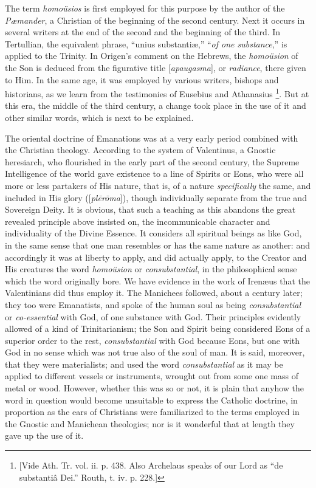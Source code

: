The term \emph{homoüsios} is first employed for this purpose by
the author of the \emph{Pæmander}, a Christian of the beginning of
the second century. Next it occurs in several writers at the end of
the second and the beginning of the third. In Tertullian, the
equivalent phrase, ``unius substantiæ,'' ``\emph{of one
substance},'' is applied to the Trinity. In Origen's comment on
the Hebrews, the \emph{homoüsion} of the Son is deduced from the
figurative title [\emph{apaugasma}], or \emph{radiance}, there given
to Him. In the same age, it was employed by various writers, bishops
and historians, as we learn from the testimonies of Eusebius and
Athanasius \footnote{[Vide Ath. Tr. vol. ii. p. 438. Also
Archelaus speaks of our Lord as ``de substantiâ Dei.'' Routh,
t. iv. p. 228.]}. But at
this era, the middle of the third century, a change took place
in the use of it and other similar words, which is next to be
explained.

The oriental doctrine of Emanations was at a very early period
combined with the Christian theology. According to the system of
Valentinus, a Gnostic heresiarch, who flourished in the early part of
the second century, the Supreme Intelligence of the world gave
existence to a line of Spirits or Eons, who were all more or less
partakers of His nature, that is, of a nature \emph{specifically} the
same, and included in His glory ([\emph{pl\={e}r\={o}ma}]),
though individually separate from the true and Sovereign Deity. It is
obvious, that such a teaching as this abandons the great revealed
principle above insisted on, the incommunicable character and
individuality of the Divine Essence. It considers all spiritual beings
as like God, in the same sense that one man resembles or has the same
nature as another: and accordingly it was at liberty to apply, and did
actually apply, to the Creator and His creatures the word \emph{homoüsion}
or \emph{consubstantial}, in the philosophical sense which the word
originally bore. We have evidence in the work of Irenæus that the
Valentinians did thus employ it. The Manichees followed, about a
century later; they too were Emanatists, and spoke of the human soul
as being \emph{consubstantial} or \emph{co-essential} with God, of one
substance with God. Their principles evidently allowed of a kind of
Trinitarianism; the Son and Spirit being considered Eons of a superior
order to the rest, \emph{consubstantial} with God because Eons, but
one with God in no sense which was not true also of the soul of man.
It is said, moreover, that they were materialists; and used the word \emph{consubstantial}
as it may be applied to different vessels or instruments,
wrought out from some one mass of metal or wood. However, whether this
was so or not, it is plain that anyhow the word in question would
become unsuitable to express the Catholic doctrine, in proportion as
the ears of Christians were familiarized to the terms employed in the
Gnostic and Manichean theologies; nor is it wonderful that at length
they gave up the use of it.

